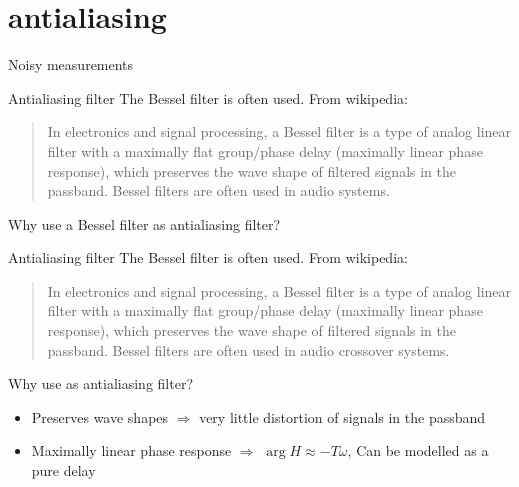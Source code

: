 \documentclass[presentation,aspectratio=169]{beamer}
\begin{document}
\section{antialiasing}
\label{sec-4}



\begin{frame}[label=sec-4-1]{Noisy measurements}
\end{frame}

\begin{frame}[label=sec-4-2]{Antialiasing filter}
The \alert{Bessel filter} is often used. From wikipedia:
\begin{quote}
In electronics and signal processing, a Bessel filter is a type of analog linear filter with a maximally flat group/phase delay (maximally linear phase response), which preserves the wave shape of filtered signals in the passband. Bessel filters are often used in audio systems.
\end{quote}

Why use a Bessel filter as antialiasing filter?
\end{frame}


\begin{frame}[label=sec-4-3]{Antialiasing filter}
The \alert{Bessel filter} is often used. From wikipedia:
\begin{quote}
In electronics and signal processing, a Bessel filter is a type of analog linear filter with a maximally flat group/phase delay (maximally linear phase response), which preserves the wave shape of filtered signals in the passband. Bessel filters are often used in audio crossover systems.
\end{quote}

Why use as antialiasing filter?
\begin{itemize}
\item Preserves wave shapes \(\Rightarrow\) very little distortion of signals in the passband
\item Maximally linear phase response \(\Rightarrow\) \(\arg H \approx -T\omega\),  Can be modelled as a pure delay
\end{itemize}
\end{frame}
\end{document}
